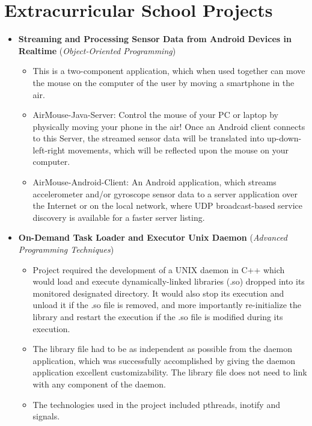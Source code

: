 \documentclass[11pt,a4paper]{article}
\begin{document}
\section{Extracurricular School Projects}
	\begin{itemize}
	\item	\label{oop}  \textbf{Streaming and Processing Sensor Data from Android Devices in Realtime} (\textit{Object-Oriented Programming})
		\begin{itemize}
		\item	This is a two-component application, which when used together can move the mouse on the computer of the user by moving a smartphone in the air.
		\item	AirMouse-Java-Server: Control the mouse of your PC or laptop by physically moving your phone in the air! Once an Android client connects to this Server, the streamed sensor data will be translated into up-down-left-right movements, which will be reflected upon the mouse on your computer.
		\item	AirMouse-Android-Client: An Android application, which streams accelerometer and/or gyroscope sensor data to a server application over the Internet or on the local network, where UDP broadcast-based service discovery is available for a faster server listing.
		\end{itemize}
	\item	\label{apt}  \textbf{On-Demand Task Loader and Executor Unix Daemon} (\textit{Advanced Programming Techniques})
		\begin{itemize}
		\item	Project required the development of a UNIX daemon in C++ which would load and execute dynamically-linked libraries (.so) dropped into its monitored designated directory. It would also stop its execution and unload it if the .so file is removed, and more importantly re-initialize the library and restart the execution if the .so file is modified during its execution.
		\item	The library file had to be as independent as possible from the daemon application, which was successfully accomplished by giving the daemon application excellent customizability. The library file does not need to link with any component of the daemon.
		\item	The technologies used in the project included pthreads, inotify and signals.

\end{itemize}
\end{itemize}
\end{document}
